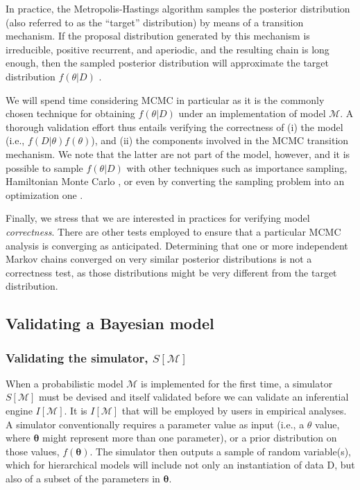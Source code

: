 \documentclass[oneside]{article}
\begin{document}
In practice, the Metropolis-Hastings algorithm samples the posterior
distribution (also referred to as the ``target'' distribution) by means of a
transition mechanism. 
If the proposal distribution generated by this mechanism is
irreducible, positive recurrent, and aperiodic, and the resulting
chain is long enough, then the sampled posterior distribution will approximate
the target distribution $f(\theta|D)$ \citep{smith93,tierney94,gelman}.

We will spend time considering MCMC in particular as it is the commonly
chosen technique for obtaining $f(\theta|D)$ under an implementation of
model $\mathcal{M}$.
A thorough validation effort thus entails verifying the
correctness of (i) the model (i.e., $f(D|\theta)f(\theta)$), and (ii)
the components involved in the MCMC transition mechanism.
We note that the latter are not part of the model, however, and it is 
possible to sample $f(\theta|D)$ with other techniques such as importance
sampling, Hamiltonian Monte Carlo \citep{hmc}, or even by converting the
sampling problem into an optimization one \citep[e.g.,][]{zhang18}.

Finally, we stress that we are interested in practices for verifying model
\emph{correctness}.
There are other tests employed to ensure that a particular MCMC analysis
is converging as anticipated.
Determining that one or more independent Markov chains converged on very
similar posterior distributions is not a correctness test, as those
distributions might be very different from the target distribution.

\subsection*{Validating a Bayesian model}

\subsubsection*{Validating the simulator, $S[\mathcal{M}]$}
\label{verify-correctness-of-simulator-implementation}

When a probabilistic model $\mathcal{M}$ is implemented for the first
time, a simulator $S[\mathcal{M}]$ must be devised and itself
validated before we can validate an inferential engine $I[\mathcal{M}]$.
It is $I[\mathcal{M}]$ that will be employed by users in empirical
analyses.
A simulator conventionally requires a parameter value as input (i.e.,
a $\theta$ value, where $\boldsymbol{\theta}$ might represent more than one
parameter), or a prior distribution on those values,
$f(\boldsymbol{\theta})$. 
The simulator then outputs a sample of random variable(s), which
for hierarchical models will include not only an instantiation of data
$\text{D}$, but also of a subset of the parameters in
$\boldsymbol{\theta}$.
\end{document}
